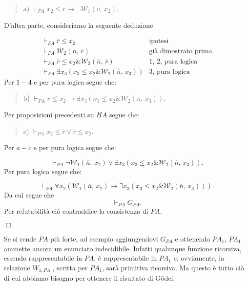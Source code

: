 	\begin{quote}
	a) $\vdash_{PA} x_2\leq\overline{r}\rightarrow\neg\mathcal{W}_1
	(\overline{v},\,x_2)$.
	\end{quote}
	D'altra parte, consideriamo la seguente deduzione
	
	$$
	\begin{array}{ll}
	\vdash_{PA}\overline{r}\leq x_2						 								& \mbox{ipotesi}\\
	\vdash_{PA}\mathcal{W}_2(\overline{n},\,\overline{r})								& \mbox{gi\`a dimostrato prima}\\
	\vdash_{PA}\overline{r}\leq x_2\&\mathcal{W}_2(\overline{n},\,\overline{r})		& \mbox{1, 2, pura logica}\\
	\vdash_{PA}\exists x_3(x_3\leq x_2\&\mathcal{W}_2(\overline{n},\,x_3))			& \mbox{3, pura logica}
	\end{array}
	$$
	Per $1-4$ e per pura logica segue che:
	
	\begin{quote}
	b) $\vdash_{PA}\overline{r}\leq x_2\rightarrow
	\exists x_3(x_3\leq x_2\&\mathcal{W}_2(\overline{n},\,x_3)).$
	\end{quote}
	Per proposizioni precedenti su $HA$ segue che:
	
	\begin{quote}
	c) $\vdash_{PA} x_2\leq\overline{r}\vee\overline{r}\leq x_2.$
	\end{quote}
	Per $a-c$ e per pura logica segue che:
	
	$$
	\vdash_{PA}\neg\mathcal{W}_1(\overline{n},\,x_2)\vee\exists x_3
	(x_3\leq x_2\&\mathcal{W}_2(\overline{n},\,x_3)).
	$$
	Per pura logica segue che:
	
	$$
	\vdash_{PA}\forall x_2(\mathcal{W}_1(\overline{n},\,x_2)\rightarrow\exists x_3
	(x_3\leq x_2\&\mathcal{W}_2(\overline{n},\,x_3))).
	$$
	Da cui segue che
		$$\vdash_{PA} G_{PA}.$$
	Per refutabilit\`a ci\`o contraddice la consistenza di
	$PA$.\begin{flushright}$\Box$\end{flushright}
	
	Se si rende $PA$ pi\`u forte, ad esempio aggiungendovi $G_{PA}$ e
	ottenendo $PA_1$, $PA_1$ ammette ancora un
	enunciato indecidibile. Infatti
	qualunque funzione ricorsiva, essendo rappresentabile in $PA$, \`e
	rappresentabile in $PA_1$ e, ovviamente, la relazione $W_{1,PA_1}$,
	scritta per $PA_1$, sar\`a primitiva ricorsiva. Ma questo \`e
	tutto ci\`o di cui abbiamo
	bisogno per ottenere il risultato di G\"odel.
	
